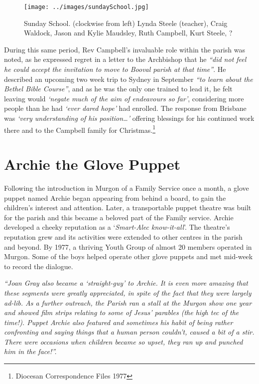 \begin{figure}[!htb]
\begin{center}
\texttt{[image: ../images/sundaySchool.jpg]}
\caption{Sunday School. (clockwise from left) Lynda Steele (teacher), Craig Waldock, Jason and Kylie Maudsley, Ruth Campbell, Kurt Steele, ?}
\end{center}
\end{figure}




During this same period, Rev Campbell's invaluable role within the parish was noted, as he expressed regret in a letter to the Archbishop that he \emph{``did not feel he could accept the invitation to move to Booval parish at that time''}. He described an upcoming two week trip to Sydney in September \emph{``to learn about the Bethel Bible Course''}, and as he was the only one trained to lead it, he felt leaving would \emph{`negate much of the aim of endeavours so far'}, considering more people than he had \emph{`ever dared hope'} had enrolled. The response from Brisbane was \emph{`very understanding of his position\ldots'} offering blessings for his continued work there and to the Campbell family for Christmas.\footnote{Diocesan Correspondence Files 1977}


\section{Archie the Glove Puppet}



Following the introduction in Murgon of a Family Service once a month, a glove puppet named Archie began appearing from behind a board, to gain the children's interest and attention. Later, a transportable puppet theatre was built for the parish and this became a beloved part of the Family service. Archie developed a cheeky reputation as a `\emph{Smart-Alec know-it-all}'. The theatre's reputation grew and its activities were extended to other centres in the parish and beyond. By 1977, a thriving Youth Group of almost 20 members operated in Murgon. Some of the boys helped operate other glove puppets and met mid-week to record the dialogue.



\emph{``Joan Gray also became a `straight-guy' to Archie. It is even more amazing that these segments were greatly appreciated, in spite of the fact that they were largely ad-lib. As a further outreach, the Parish ran a stall at the Murgon show one year and showed film strips relating to some of Jesus' parables (the high tec of the time!). Puppet Archie also featured and sometimes his habit of being rather confronting and saying things that a human person couldn't, caused a bit of a stir. There were occasions when children became so upset, they ran up and punched him in the face!''.}



